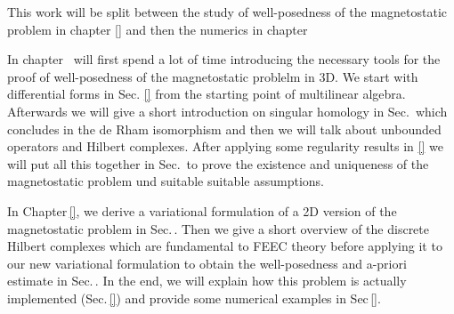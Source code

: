 \documentclass[../master_thesis.tex]{subfiles}
\begin{document}

This work will be split between the study of well-posedness of the magnetostatic problem 
in chapter \ref{} and then the numerics in chapter \,

In chapter \, will first spend a lot of time 
introducing the necessary tools for the proof of well-posedness of the magnetostatic problelm 
in 3D. We start with differential forms in Sec. \ref{} from the starting point 
of multilinear algebra. Afterwards we will give a short introduction on 
singular homology in Sec.\, which concludes in the de Rham isomorphism and then 
we will talk about unbounded operators and Hilbert 
complexes. After applying some regularity results in \ref{}
we will put all this together in Sec.\, to prove the existence and uniqueness 
of the magnetostatic problem und suitable suitable assumptions.

In Chapter\,\ref{}, we derive a variational formulation of a 2D version of the 
magnetostatic problem in Sec.\,. Then we give a short overview of the discrete Hilbert complexes 
which are fundamental to FEEC theory before applying it to our new variational formulation 
to obtain the well-posedness and a-priori estimate in Sec.\,. In the end, we will explain how this 
problem is actually implemented (Sec.\,\ref{}) and provide some numerical examples in Sec\,\ref{}.
\end{document}
